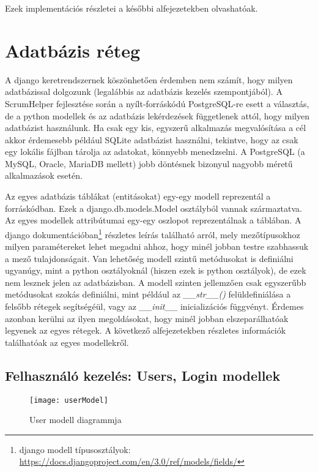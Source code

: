 Ezek implementációs részletei a későbbi alfejezetekben olvashatóak. 

\section{Adatbázis réteg}
\label{dbmodels}

A django keretrendszernek köszönhetően érdemben nem számít, hogy milyen adatbázissal dolgozunk (legalábbis az adatbázis kezelés szempontjából). A ScrumHelper fejlesztése során a nyílt-forráskódú PostgreSQL-re esett a választás, de a python modellek és az adatbázis lekérdezések függetlenek attól, hogy milyen adatbázist használunk. Ha csak egy kis, egyszerű alkalmazás megvalósítása a cél akkor érdemesebb például SQLite adatbázist használni, tekintve, hogy az csak egy lokális fájlban tárolja az adatokat, könnyebb menedzselni. A PostgreSQL (a MySQL, Oracle, MariaDB mellett) jobb döntésnek bizonyul nagyobb méretű alkalmazások esetén. 

Az egyes adatbázis táblákat (entitásokat) egy-egy modell reprezentál a forráskódban. Ezek a django.db.models.Model osztályból vannak származtatva. Az egyes modellek attribútumai egy-egy oszlopot reprezentálnak a táblában. A django dokumentációban\footnote{django modell típusosztályok: \url{https://docs.djangoproject.com/en/3.0/ref/models/fields/}} részletes leírás található arról, mely mezőtípusokhoz milyen paramétereket lehet megadni ahhoz, hogy minél jobban testre szabhassuk a mező tulajdonságait. Van lehetőség modell szintű metódusokat is definiálni ugyanúgy, mint a python osztályoknál (hiszen ezek is python osztályok), de ezek nem lesznek jelen az adatbázisban. A modell szinten jellemzően csak egyszerűbb metódusokat szokás definiálni, mint például az \textit{\_\_str\_\_()} felüldefiniálása a felsőbb rétegek segítségéül, vagy az \textit{\_\_init\_\_} inicializációs függvényt. Érdemes azonban kerülni az ilyen megoldásokat, hogy minél jobban elszeparálhatóak legyenek az egyes rétegek.  A következő alfejezetekben részletes információk találhatóak az egyes modellekről.

\subsection{Felhasználó kezelés: Users, Login modellek}

\begin{figure}[H]
	\centering
	\texttt{[image: userModel]}
	\caption{User modell diagrammja}
	\label{fig:usermodel}
\end{figure}


